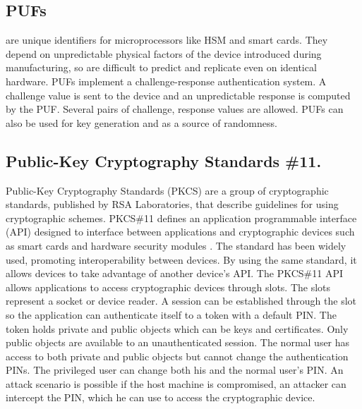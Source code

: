 \subsection{PUFs} are unique identifiers for microprocessors like HSM and smart cards. They depend on unpredictable physical factors of the device introduced during manufacturing, so are difficult to predict and replicate even on identical hardware. PUFs implement a challenge-response authentication system. A challenge value is sent to the device and an unpredictable response is computed by the PUF. Several pairs of challenge, response values are allowed. PUFs can also be used for key generation and as a source of randomness. \label{PUF}

\subsection{Public-Key Cryptography Standards \#11.}
Public-Key Cryptography Standards (PKCS) are a group of cryptographic standards, published by RSA Laboratories, that describe guidelines for using cryptographic schemes.
PKCS\#11 defines an application programmable interface (API) designed to interface between applications and cryptographic devices such as smart cards and hardware security modules \cite{pkcs11analysis}. 
The standard has been widely used, promoting interoperability between devices. By using the same standard, it allows devices to take advantage of another device's API.
The PKCS\#11 API allows applications to access cryptographic devices through slots. The slots represent a socket or device reader. A session can be established through the slot so the application can authenticate itself to a token with a default PIN. The token holds private and public objects which can be keys and certificates. Only public objects are available to an unauthenticated session. The normal user has access to both private and public objects but cannot change the authentication PINs. The privileged user can change both his and the normal user's PIN.
An attack scenario is possible if the host machine is compromised, an attacker can intercept the PIN, which he can use to access the cryptographic device.
